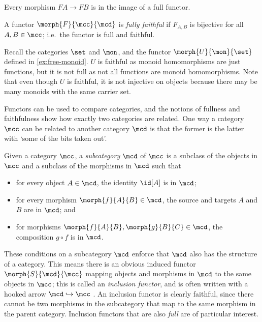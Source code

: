Every morphism \(FA \to FB\) is in the image of a full functor.

\begin{definition}
    A functor \(\morph{F}{\mcc}{\mcd}\) is \emph{fully faithful} if \(F_{A,B}\)
    is bijective for all \(A, B \in \mcc\); i.e.\ the functor is full and
    faithful.
\end{definition}

\begin{example}
    Recall the categories \(\set\) and \(\mon\), and the functor
    \(\morph{U}{\mon}{\set}\) defined in \cref{ex:free-monoid}.
    \(U\) is faithful as monoid homomorphisms are just functions, but it is not
    full as not all functions are monoid homomorphisms.
    Note that even though \(U\) is faithful, it is not injective on objects
    because there may be many monoids with the same carrier set.
\end{example}

Functors can be used to compare categories, and the notions of fullness and
faithfulness show how exactly two categories are related.
One way a category \(\mcc\) can be related to another category \(\mcd\) is that
the former is the latter with `some of the bits taken out'.

\begin{definition}[Subcategory]
    Given a category \(\mcc\), a \emph{subcategory} \(\mcd\) of \(\mcc\) is a
    subclass of the objects in \(\mcc\) and a subclass of the morphisms in
    \(\mcd\) such that
    \begin{itemize}
        \item for every object \(A \in \mcd\), the identity \(\id[A]\) is in
              \(\mcd\);
        \item for every morphism \(\morph{f}{A}{B} \in \mcd\), the source and
              targets \(A\) and \(B\) are in \(\mcd\); and
        \item for morphisms \(\morph{f}{A}{B}, \morph{g}{B}{C} \in \mcd\), the
              composition \(g \circ f\) is in \(\mcd\).
    \end{itemize}
\end{definition}

These conditions on a subcategory \(\mcd\) enforce that \(\mcd\) also has the
structure of a category.
This means there is an obvious induced functor \(\morph{S}{\mcd}{\mcc}\) mapping
objects and morphisms in \(\mcd\) to the same objects in \(\mcc\); this is
called an \emph{inclusion functor}, and is
often written with a hooked arrow \(\mcd \hookrightarrow \mcc\)
.
An inclusion functor is clearly faithful, since there cannot be two morphisms in
the subcategory that map to the same morphism in the parent category.
Inclusion functors that are also \emph{full} are of particular interest.


